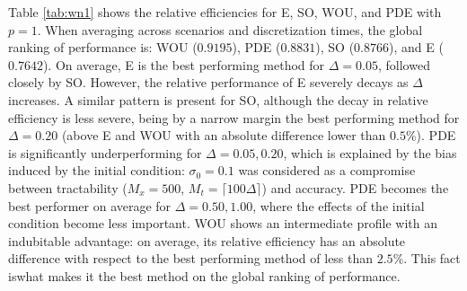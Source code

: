 \documentclass[oneside,11pt]{article}
\begin{document}
Table \ref{tab:wn1} shows the relative efficiencies for E, SO, WOU, and PDE with $p=1$. When averaging across scenarios and discretization times, the global ranking of performance is: WOU ($0.9195$), PDE ($0.8831$), SO ($0.8766$), and E ($0.7642$). On average, E is the best performing method for $\Delta=0.05$, followed closely by SO. However, the relative performance of E severely decays as $\Delta$ increases. A similar pattern is present for SO, although the decay in relative efficiency is less severe, being by a narrow margin the best performing method for $\Delta=0.20$ (above E and WOU with an absolute difference lower than $0.5\%$). PDE is significantly underperforming for $\Delta=0.05,0.20$, which is explained by the bias induced by the initial condition: $\sigma_0=0.1$ was considered as a compromise between tractability ($M_x=500$, $M_t=\lceil100\Delta\rceil$) and accuracy. PDE becomes the best performer on average for $\Delta=0.50,1.00$, where the effects of the initial condition become less important. WOU shows an intermediate profile with an indubitable advantage: on average, its relative efficiency has an absolute difference with respect to the best performing method of less than $2.5\%$. This fact is\nopagebreak[4] what makes it the best method on the global ranking of performance.
\end{document}
